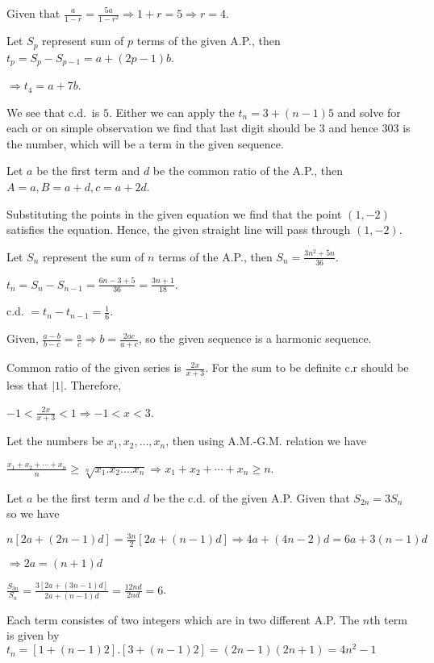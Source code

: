   Given that $\frac{a}{1 - r} = \frac{5a}{1 - r^2}\Rightarrow 1 + r = 5\Rightarrow r = 4$.
\item Let $S_p$ represent sum of $p$ terms of the given A.P., then $t_p = S_p - S_{p - 1} = a + (2p - 1)b$.

  $\Rightarrow t_4 = a + 7b$.
\item We see that c.d.\ is $5$. Either we can apply the $t_n = 3 + (n - 1)5$ and solve for each or on simple
  observation we find that last digit should be $3$ and hence $303$ is the number, which will be a term in
  the given sequence.
\item Let $a$ be the first term and $d$ be the common ratio of the A.P., then $A = a, B = a + d, c = a +
  2d$.

  Substituting the points in the given equation we find that the point $(1, -2)$ satisfies the
  equation. Hence, the given straight line will pass through $(1, -2)$.
\item Let $S_n$ represent the sum of $n$ terms of the A.P., then $S_n = \frac{3n^2 + 5n}{36}$.

  $t_n = S_n - S_{n - 1} = \frac{6n - 3 + 5}{36} = \frac{3n + 1}{18}$.

  c.d. $= t_n - t_{n - 1} = \frac{1}{6}$.
\item Given, $\frac{a - b}{b - c} = \frac{a}{c} \Rightarrow b = \frac{2ac}{a + c}$, so the given sequence is
  a harmonic sequence.
\item Common ratio of the given series is $\frac{2x}{x + 3}$. For the sum to be definite c.r should be less
  that $|1|$. Therefore,

  $-1 < \frac{2x}{x + 3} < 1 \Rightarrow -1 < x < 3$.
\item Let the numbers be $x_1, x_2, \ldots, x_n$, then using A.M.-G.M. relation we have

  $\frac{x_1 + x_2 + \cdots + x_n}{n}\geq \sqrt[n]{x_1.x_2.\ldots x_n} \Rightarrow x_1 + x_2 + \cdots +
  x_n\geq n$.
\item Let $a$ be the first term and $d$ be the c.d. of the given A.P. Given that $S_{2n} = 3S_n$ so we have

  $n[2a + (2n - 1)d] = \frac{3n}{2}[2a + (n - 1)d] \Rightarrow 4a + (4n - 2)d = 6a + 3(n - 1)d$

  $\Rightarrow 2a = (n + 1)d$

  $\frac{S_{3n}}{S_n} = \frac{3[2a + (3n - 1)d]}{2a + (n - 1)d} = \frac{12nd}{2nd} = 6$.
\item Each term consistes of two integers which are in two different A.P. The $n$th term is given by $t_n =
  [1 + (n - 1)2].[3 + (n - 1)2] = (2n - 1)(2n + 1) = 4n^2 - 1$

